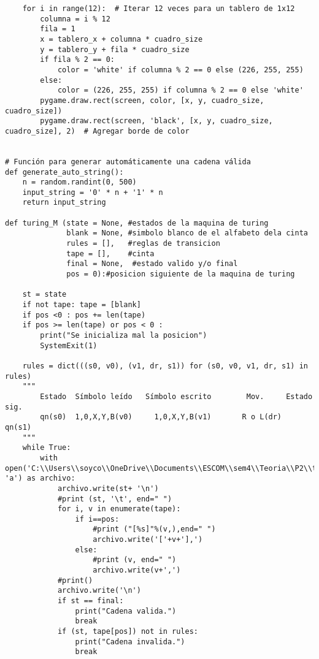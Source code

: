 \begin{lstlisting}
    for i in range(12):  # Iterar 12 veces para un tablero de 1x12
        columna = i % 12
        fila = 1
        x = tablero_x + columna * cuadro_size
        y = tablero_y + fila * cuadro_size
        if fila % 2 == 0:
            color = 'white' if columna % 2 == 0 else (226, 255, 255)
        else:
            color = (226, 255, 255) if columna % 2 == 0 else 'white'
        pygame.draw.rect(screen, color, [x, y, cuadro_size, cuadro_size])
        pygame.draw.rect(screen, 'black', [x, y, cuadro_size, cuadro_size], 2)  # Agregar borde de color 
       
 
# Función para generar automáticamente una cadena válida
def generate_auto_string():
    n = random.randint(0, 500)
    input_string = '0' * n + '1' * n
    return input_string

def turing_M (state = None, #estados de la maquina de turing
              blank = None, #simbolo blanco de el alfabeto dela cinta
              rules = [],   #reglas de transicion
              tape = [],    #cinta
              final = None,  #estado valido y/o final
              pos = 0):#posicion siguiente de la maquina de turing

    st = state
    if not tape: tape = [blank]
    if pos <0 : pos += len(tape)
    if pos >= len(tape) or pos < 0 : 
        print("Se inicializa mal la posicion")
        SystemExit(1)
    
    rules = dict(((s0, v0), (v1, dr, s1)) for (s0, v0, v1, dr, s1) in rules)
    """
        Estado	Símbolo leído	Símbolo escrito	       Mov. 	Estado sig.
        qn(s0)  1,0,X,Y,B(v0)	  1,0,X,Y,B(v1)       R o L(dr)	   qn(s1)
    """
    while True:
        with open('C:\\Users\\soyco\\OneDrive\\Documents\\ESCOM\\sem4\\Teoria\\P2\\turing\\output\\turing.txt', 'a') as archivo:
            archivo.write(st+ '\n')
            #print (st, '\t', end=" ")
            for i, v in enumerate(tape):
                if i==pos: 
                    #print ("[%s]"%(v,),end=" ")
                    archivo.write('['+v+'],')
                else: 
                    #print (v, end=" ")
                    archivo.write(v+',') 
            #print()
            archivo.write('\n')
            if st == final: 
                print("Cadena valida.")
                break
            if (st, tape[pos]) not in rules: 
                print("Cadena invalida.")
                break
            

\end{lstlisting}
